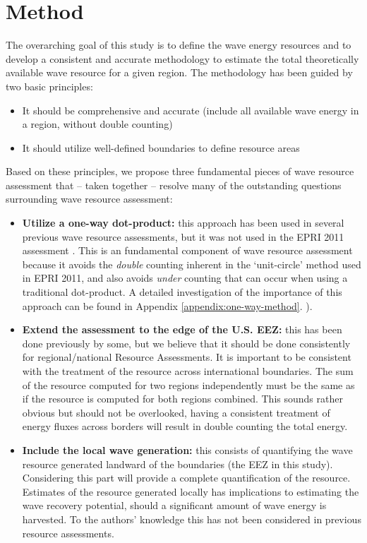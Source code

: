 \section{Method} \label{sec:method}
The overarching goal of this study is to define the wave energy resources and to develop a consistent and accurate methodology to estimate the total theoretically available wave resource for a given region. The methodology has been guided by two basic principles:
\begin{itemize}
\item It should be comprehensive and accurate (include all available wave energy in a region, without double counting) 
\item It should utilize well-defined boundaries to define resource areas 
\end{itemize}

Based on these principles, we propose three fundamental pieces of wave resource assessment that -- taken together -- resolve many of the outstanding questions surrounding wave resource assessment:
\begin{itemize}
\item {\bf Utilize a one-way dot-product:} this approach has been used in several previous wave resource assessments, but it was not used in the EPRI 2011 assessment . This is an fundamental component of wave resource assessment because it avoids the {\em double} counting inherent in the `unit-circle' method used in EPRI 2011, and also avoids {\em under} counting that can occur when using a traditional dot-product. A detailed investigation of the importance of this approach can be found in Appendix \ref{appendix:one-way-method}. 
\cite{EPRIwaveresource2011}).
\item {\bf Extend the assessment to the edge of the U.S. EEZ:} this has been done previously by some, but we believe that it should be done consistently for regional/national Resource Assessments. It is important to be consistent with the treatment of the resource across international boundaries. The sum of the resource computed for two regions independently must be the same as if the resource is computed for both regions combined. This sounds rather obvious but should not be overlooked, having a consistent treatment of energy fluxes across borders will result in double counting the total energy.
\item {\bf Include the local wave generation:} this consists of quantifying the wave resource generated landward of the boundaries (the EEZ in this study). Considering this part will provide a complete quantification of the resource. Estimates of the resource generated locally has implications to estimating the wave recovery potential, should a significant amount of wave energy is harvested. To the authors' knowledge this has not been considered in previous resource assessments.
\end{itemize}


